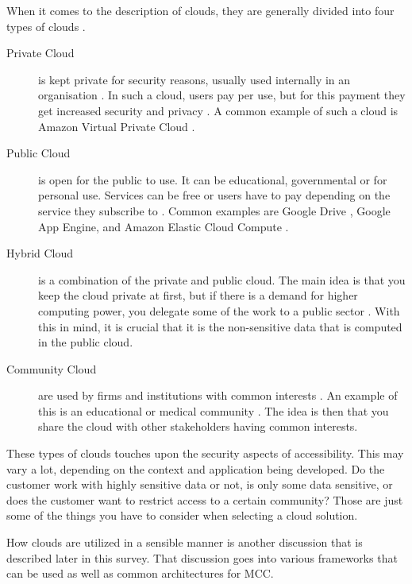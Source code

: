 When it comes to the description of clouds, they are generally divided into four types of clouds \citep{article:mobilecloudreviewinderkilde,article:mobilecloudreviewinderkildesecurity}.
\begin{description} 
\item[Private Cloud]
	is kept private for security reasons, usually used internally in an organisation \citep{article:mobilecloudreviewinderkildesecurity}.
	In such a cloud, users pay per use, but for this payment they get increased security and privacy \citep{article:mobilecloudreviewinderkilde}.
	A common example of such a cloud is Amazon Virtual Private Cloud \citep{article:mobilecloudreviewinderkilde}.
\item[Public Cloud]
	is open for the public to use. It can be educational, governmental or for personal use. Services can be free or users have to pay depending on the service they subscribe to \citep{article:mobilecloudreviewinderkilde}.
	Common examples are Google Drive \citep{article:mobilecloudreviewinderkildesecurity}, Google App Engine, and Amazon Elastic Cloud Compute \citep{article:mobilecloudreviewinderkilde}. 
\item[Hybrid Cloud]
	is a combination of the private and public cloud.
	The main idea is that you keep the cloud private at first, but if there is a demand for higher computing power, you delegate some of the work to a public sector \citep{article:mobilecloudreviewinderkilde}. With this in mind, it is crucial that it is the non-sensitive data that is computed in the public cloud.
\item[Community Cloud]
	are used by firms and institutions with common interests \citep{article:mobilecloudreviewinderkilde}.
	An example of this is an educational or medical community \citep{article:mobilecloudreviewinderkildesecurity}.
	The idea is then that you share the cloud with other stakeholders having common interests.
\end{description}
These types of clouds touches upon the security aspects of accessibility.
This may vary a lot, depending on the context and application being developed.
Do the customer work with highly sensitive data or not, is only some data sensitive, or does the customer want to restrict access to a certain community?
Those are just some of the things you have to consider when selecting a cloud solution. 

How clouds are utilized in a sensible manner is another discussion that is described later in this survey. That discussion goes into various frameworks that can be used as well as common architectures for MCC.
